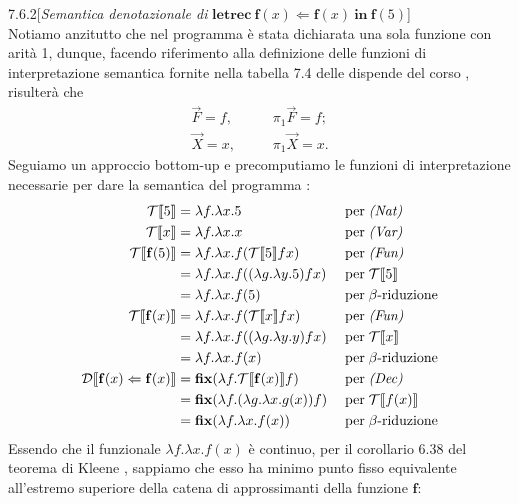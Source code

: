\begin{customexe}{7.6.2}[\textit{Semantica denotazionale di} $\textbf{letrec} \ \mathbf{f}(x) \Leftarrow \mathbf{f}(x) \ \textbf{in} \ \mathbf{f}(5)$]  \label{es:7.6.2} \hfill \\
Notiamo anzitutto che nel programma è stata dichiarata una sola funzione con arità 1, dunque,  facendo riferimento alla definizione delle funzioni di interpretazione semantica fornite nella tabella 7.4 delle dispende del corso \cite{mssc2016}, risulterà che 
\begin{align*}
	\vec{F} =  f \text{,} & \qquad \pi_1 \vec{F} = f; \\
	\vec{X} =  x \text{,} & \qquad \pi_1 \vec{X} = x.
\end{align*}
Seguiamo un approccio bottom-up e precomputiamo le funzioni di interpretazione necessarie per dare la semantica del programma {\SLF}:
\begin{align*}
\mathcal{T} \llbracket 5 \rrbracket 
	&= \lambda{f}.\lambda{x}.5 
		&& \; \text{per} \; \textit{(Nat)} \\
\mathcal{T} \llbracket x \rrbracket 
	&= \lambda{f}.\lambda{x}.x 
		&& \; \text{per} \; \textit{(Var)} \\
\mathcal{T} \llbracket \mathbf{f}(5) \rrbracket 
	&= \lambda{f}.\lambda{x}.f(\mathcal{T} \llbracket 5 \rrbracket f x)
		&& \; \text{per} \; \textit{(Fun)} \\
	&= \lambda{f}.\lambda{x}.f((\lambda{g}.\lambda{y}.5) f x) 
		&& \; \text{per} \; \mathcal{T} \llbracket 5 \rrbracket \\
	&= \lambda{f}.\lambda{x}.f(5) 
		&& \; \text{per} \; \beta\text{-riduzione} \\
\mathcal{T} \llbracket \mathbf{f}(x) \rrbracket 
	&= \lambda{f}.\lambda{x}.f(\mathcal{T} \llbracket x \rrbracket f x)
		&& \; \text{per} \; \textit{(Fun)} \\
	&= \lambda{f}.\lambda{x}.f((\lambda{g}.\lambda{y}.y) f x) 
		&& \; \text{per} \; \mathcal{T} \llbracket x \rrbracket \\
	&= \lambda{f}.\lambda{x}.f(x) 
		&& \; \text{per} \; \beta\text{-riduzione} \\
\mathcal{D} \llbracket \mathbf{f}(x) \Leftarrow \mathbf{f}(x) \rrbracket 
	&= \mathbf{fix}(\lambda{f}.\mathcal{T}\llbracket \mathbf{f}(x) \rrbracket f) 
		&& \; \text{per} \; \textit{(Dec)} \\
	&= \mathbf{fix}(\lambda{f}.(\lambda{g}.\lambda{x}.g(x))f) 
		&& \; \text{per} \; \mathcal{T} \llbracket f(x) \rrbracket \\
	&= \mathbf{fix}(\lambda{f}.\lambda{x}.f(x)) 
		&& \; \text{per} \; \beta\text{-riduzione}
\end{align*}
Essendo che il funzionale $\lambda{f}.\lambda{x}.f(x)$ è continuo, per il corollario 6.38 del teorema di Kleene \cite{mssc2016}, sappiamo che esso ha minimo punto fisso equivalente all'estremo superiore della catena di approssimanti della funzione $\mathbf{f}$: \[
\]
\end{customexe}
